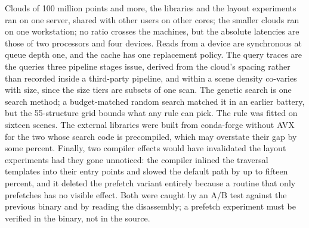 Clouds of 100 million points and more, the libraries and the layout experiments ran on one server, shared with other users on other cores; the smaller clouds ran on one workstation; no ratio crosses the machines, but the absolute latencies are those of two processors and four devices. Reads from a device are synchronous at queue depth one, and the cache has one replacement policy. The query traces are the queries three pipeline stages issue, derived from the cloud's spacing rather than recorded inside a third-party pipeline, and within a scene density co-varies with size, since the size tiers are subsets of one scan. The genetic search is one search method; a budget-matched random search matched it in an earlier battery, but the 55-structure grid bounds what any rule can pick. The rule was fitted on sixteen scenes. The external libraries were built from conda-forge without AVX for the two whose search code is precompiled, which may overstate their gap by some percent. Finally, two compiler effects would have invalidated the layout experiments had they gone unnoticed: the compiler inlined the traversal templates into their entry points and slowed the default path by up to fifteen percent, and it deleted the prefetch variant entirely because a routine that only prefetches has no visible effect. Both were caught by an A/B test against the previous binary and by reading the disassembly; a prefetch experiment must be verified in the binary, not in the source.
